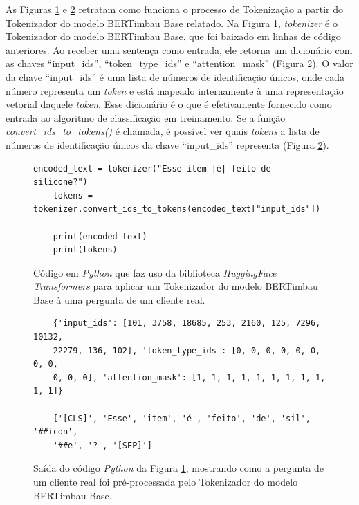 As Figuras \ref{fig:br_tokenizer_code} e \ref{fig:br_tokenizer_output} retratam como funciona o processo de Tokenização a partir do Tokenizador do modelo BERTimbau Base relatado. Na Figura \ref{fig:br_tokenizer_code}, \textit{tokenizer} é o Tokenizador do modelo BERTimbau Base, que foi baixado em linhas de código anteriores. Ao receber uma sentença como entrada, ele retorna um dicionário com as chaves ``input\_ids'', ``token\_type\_ids'' e ``attention\_mask'' (Figura \ref{fig:br_tokenizer_output}). O valor da chave ``input\_ids'' é uma lista de números de identificação únicos, onde cada número representa um \textit{token} e está mapeado internamente à uma representação vetorial daquele \textit{token}. Esse dicionário é o que é efetivamente fornecido como entrada ao algoritmo de classificação em treinamento. Se a função \textit{convert\_ids\_to\_tokens()} é chamada, é possível ver quais \textit{tokens} a lista de números de identificação únicos da chave ``input\_ids'' representa (Figura \ref{fig:br_tokenizer_output}).

\begin{figure}[!ht]
    \centering
    \begin{lstlisting}[style=python]
    encoded_text = tokenizer("Esse item |é| feito de silicone?")
    tokens = tokenizer.convert_ids_to_tokens(encoded_text["input_ids"])

    print(encoded_text)
    print(tokens)
    \end{lstlisting}
    \caption{Código em \textit{Python} que faz uso da biblioteca \textit{HuggingFace Transformers} para aplicar um Tokenizador do modelo BERTimbau Base à uma pergunta de um cliente real.}
    \label{fig:br_tokenizer_code}
\end{figure}

\begin{figure}[!ht]
    \centering
    \begin{verbatim}
    {'input_ids': [101, 3758, 18685, 253, 2160, 125, 7296, 10132, 
    22279, 136, 102], 'token_type_ids': [0, 0, 0, 0, 0, 0, 0, 0, 
    0, 0, 0], 'attention_mask': [1, 1, 1, 1, 1, 1, 1, 1, 1, 1, 1]}
    
    ['[CLS]', 'Esse', 'item', 'é', 'feito', 'de', 'sil', '##icon', 
    '##e', '?', '[SEP]']
    \end{verbatim}
    \caption{Saída do código \textit{Python} da Figura \ref{fig:br_tokenizer_code}, mostrando como a pergunta de um cliente real foi pré-processada pelo Tokenizador do modelo BERTimbau Base.}
    \label{fig:br_tokenizer_output}
\end{figure}

